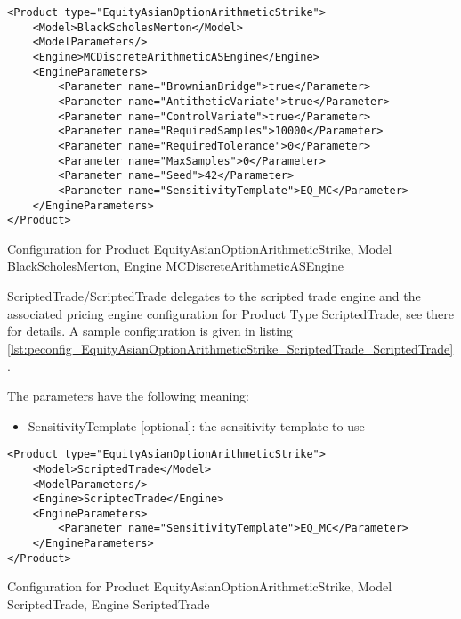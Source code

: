 \begin{longlisting}
\begin{verbatim}
<Product type="EquityAsianOptionArithmeticStrike">
    <Model>BlackScholesMerton</Model>
    <ModelParameters/>
    <Engine>MCDiscreteArithmeticASEngine</Engine>
    <EngineParameters>
        <Parameter name="BrownianBridge">true</Parameter>    
        <Parameter name="AntitheticVariate">true</Parameter>    
        <Parameter name="ControlVariate">true</Parameter>    
        <Parameter name="RequiredSamples">10000</Parameter>    
        <Parameter name="RequiredTolerance">0</Parameter>    
        <Parameter name="MaxSamples">0</Parameter>    
        <Parameter name="Seed">42</Parameter>    
        <Parameter name="SensitivityTemplate">EQ_MC</Parameter>
    </EngineParameters>
</Product>
\end{verbatim}
\caption{Configuration for Product EquityAsianOptionArithmeticStrike, Model BlackScholesMerton, Engine MCDiscreteArithmeticASEngine}
\label{lst:peconfig_EquityAsianOptionArithmeticStrike_BlackScholesMerton_MCDiscreteArithmeticASEngine}
\end{longlisting}

ScriptedTrade/ScriptedTrade delegates to the scripted trade engine and the associated pricing engine configuration for
Product Type ScriptedTrade, see there for details. A sample configuration is given in listing
\ref{lst:peconfig_EquityAsianOptionArithmeticStrike_ScriptedTrade_ScriptedTrade}.

The parameters have the following meaning:

\begin{itemize}
\item SensitivityTemplate [optional]: the sensitivity template to use 
\end{itemize}

\begin{longlisting}
\begin{verbatim}
<Product type="EquityAsianOptionArithmeticStrike">
    <Model>ScriptedTrade</Model>
    <ModelParameters/>
    <Engine>ScriptedTrade</Engine>
    <EngineParameters>
        <Parameter name="SensitivityTemplate">EQ_MC</Parameter>
    </EngineParameters>
</Product>
\end{verbatim}
\caption{Configuration for Product EquityAsianOptionArithmeticStrike, Model ScriptedTrade, Engine ScriptedTrade}
\label{lst:peconfig_EquityAsianOptionArithmeticStrike_ScriptedTrade_ScriptedTrade}
\end{longlisting}

